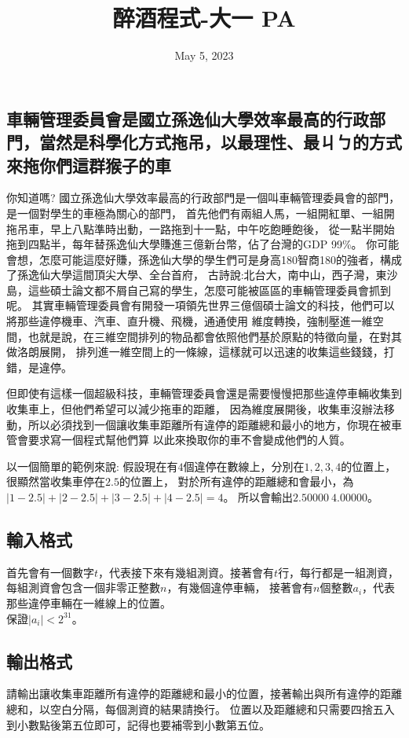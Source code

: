 \documentclass{article}
\title{醉酒程式-大一 PA}
\date{May 5, 2023}
\begin{document}
\begin{CJK*}{UTF8}{bsmi}

\maketitle

\section*{車輛管理委員會是國立孫逸仙大學效率最高的行政部門，當然是科學化方式拖吊，以最理性、最ㄐㄅ的方式來拖你們這群猴子的車}

你知道嗎? 國立孫逸仙大學效率最高的行政部門是一個叫車輛管理委員會的部門，是一個對學生的車極為關心的部門，
首先他們有兩組人馬，一組開紅單、一組開拖吊車，早上八點準時出動，一路拖到十一點，中午吃飽睡飽後，
從一點半開始拖到四點半，每年替孫逸仙大學賺進三億新台幣，佔了台灣的GDP 99\%。
你可能會想，怎麼可能這麼好賺，孫逸仙大學的學生們可是身高180智商180的強者，構成了孫逸仙大學這間頂尖大學、全台首府，
古詩說:北台大，南中山，西子灣，東沙島，這些碩士論文都不屑自己寫的學生，怎麼可能被區區的車輛管理委員會抓到呢。
其實車輛管理委員會有開發一項領先世界三億個碩士論文的科技，他們可以將那些違停機車、汽車、直升機、飛機，通通使用
維度轉換，強制壓進一維空間，也就是說，在三維空間排列的物品都會依照他們基於原點的特徵向量，在對其做洛朗展開，
排列進一維空間上的一條線，這樣就可以迅速的收集這些錢錢，打錯，是違停。

但即使有這樣一個超級科技，車輛管理委員會還是需要慢慢把那些違停車輛收集到收集車上，但他們希望可以減少拖車的距離，
因為維度展開後，收集車沒辦法移動，所以必須找到一個讓收集車距離所有違停的距離總和最小的地方，你現在被車管會要求寫一個程式幫他們算
以此來換取你的車不會變成他們的人質。

以一個簡單的範例來說: 假設現在有$4$個違停在數線上，分別在$1,2,3,4$的位置上，很顯然當收集車停在$2.5$的位置上，
對於所有違停的距離總和會最小，為$\lvert1-2.5\rvert+\lvert2-2.5\rvert+\lvert3-2.5\rvert+\lvert4-2.5\rvert=4$。
所以會輸出$2.50000\ 4.00000$。

\subsection*{輸入格式}
首先會有一個數字$t$，代表接下來有幾組測資。接著會有$t$行，每行都是一組測資，每組測資會包含一個非零正整數$n$，有幾個違停車輛，
接著會有$n$個整數$a_i$，代表那些違停車輛在一維線上的位置。\\
保證$\lvert a_i\rvert <2^{31}$。

\subsection*{輸出格式}
請輸出讓收集車距離所有違停的距離總和最小的位置，接著輸出與所有違停的距離總和，以空白分隔，每個測資的結果請換行。
位置以及距離總和只需要四捨五入到小數點後第五位即可，記得也要補零到小數第五位。


\end{CJK*}
\end{document}
